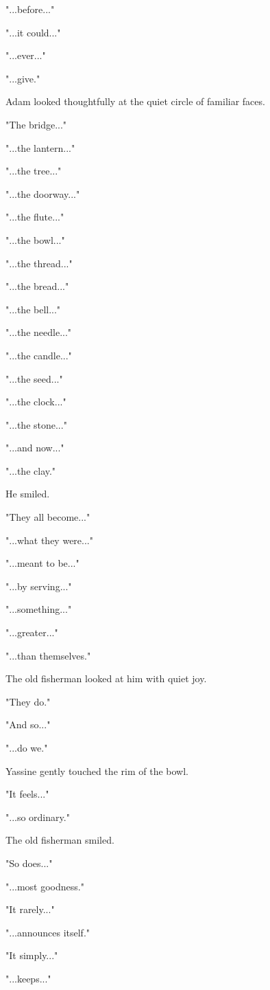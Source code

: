 \documentclass[12pt,openany]{book}
\begin{document}
"...before..."

"...it could..."

"...ever..."

"...give."

Adam looked thoughtfully at the quiet circle of familiar faces.

"The bridge..."

"...the lantern..."

"...the tree..."

"...the doorway..."

"...the flute..."

"...the bowl..."

"...the thread..."

"...the bread..."

"...the bell..."

"...the needle..."

"...the candle..."

"...the seed..."

"...the clock..."

"...the stone..."

"...and now..."

"...the clay."

He smiled.

"They all become..."

"...what they were..."

"...meant to be..."

"...by serving..."

"...something..."

"...greater..."

"...than themselves."

The old fisherman looked at him with quiet joy.

"They do."

"And so..."

"...do we."

Yassine gently touched the rim of the bowl.

"It feels..."

"...so ordinary."

The old fisherman smiled.

"So does..."

"...most goodness."

"It rarely..."

"...announces itself."

"It simply..."

"...keeps..."
\end{document}
